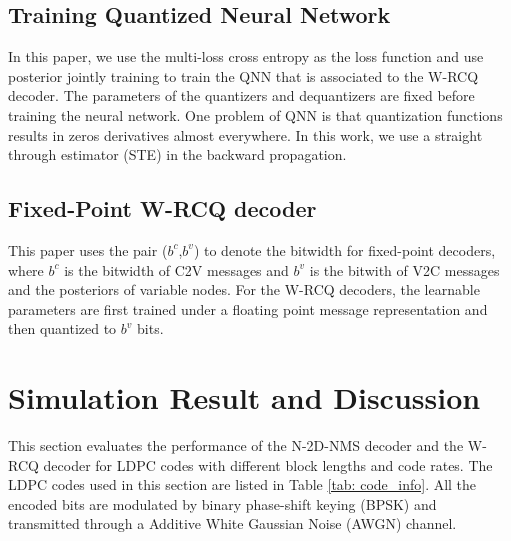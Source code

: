 \documentclass [PhD] {uclathes}
\begin{document}
\subsection{Training Quantized Neural Network}
In this paper, we use the multi-loss cross entropy as the loss function and use posterior jointly training to train the QNN that is associated to the W-RCQ decoder. 
The parameters of the quantizers and dequantizers are fixed before training the neural network.
One problem of QNN is that quantization functions results in zeros derivatives almost everywhere.
In this work, we use a straight through estimator (STE)\cite{Bengio2013-kn, Xiao2020-sb} in the backward propagation. 

\subsection{Fixed-Point W-RCQ decoder}
This paper uses the pair ($b^c$,$b^v$) to denote the bitwidth for fixed-point decoders, where $b^c$ is the bitwidth of C2V messages and $b^v$ is the bitwith of V2C messages and the posteriors of variable nodes. For the W-RCQ decoders,  the learnable parameters are first trained under a floating point message representation and then quantized to $b^v$ bits. 



\section{Simulation Result and Discussion}\label{sec: Simulation}
This section evaluates the performance of the N-2D-NMS decoder and the W-RCQ decoder for LDPC codes with different block lengths and code rates. The LDPC codes used in this section are listed in Table \ref{tab: code_info}. All the encoded bits are modulated by binary phase-shift keying (BPSK) and transmitted through a Additive White Gaussian Noise (AWGN) channel. 
\end{document}
